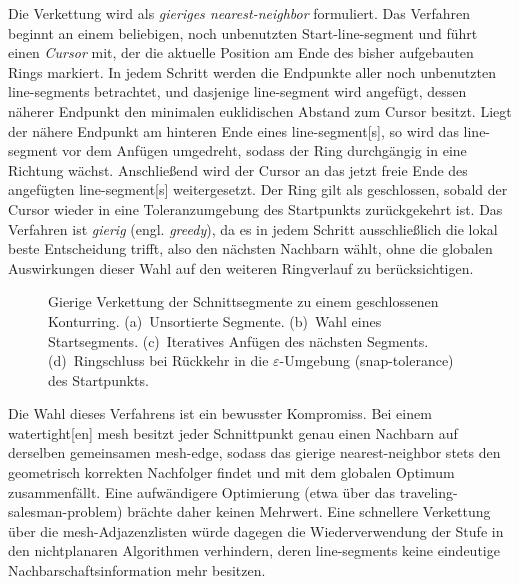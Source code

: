                 Die Verkettung wird als \emph{gieriges \gls{nearest-neighbor}} formuliert.
                Das Verfahren beginnt an einem beliebigen, noch unbenutzten Start-\gls{line-segment} und führt einen \emph{Cursor} mit, der die aktuelle Position am Ende des bisher aufgebauten Rings markiert.
                In jedem Schritt werden die Endpunkte aller noch unbenutzten \glspl{line-segment} betrachtet, und dasjenige \gls{line-segment} wird angefügt, dessen näherer Endpunkt den minimalen euklidischen Abstand zum Cursor besitzt.
                Liegt der nähere Endpunkt am hinteren Ende eines \gls{line-segment}[s], so wird das \gls{line-segment} vor dem Anfügen umgedreht, sodass der Ring durchgängig in eine Richtung wächst.
                Anschließend wird der Cursor an das jetzt freie Ende des angefügten \gls{line-segment}[s] weitergesetzt.
                Der Ring gilt als geschlossen, sobald der Cursor wieder in eine Toleranzumgebung des Startpunkts zurückgekehrt ist.
                Das Verfahren ist \emph{gierig} (engl. \emph{greedy}), da es in jedem Schritt ausschließlich die lokal beste Entscheidung trifft, also den nächsten Nachbarn wählt, ohne die globalen Auswirkungen dieser Wahl auf den weiteren Ringverlauf zu berücksichtigen.

                \begin{figure}[ht]
                    \centering
                    
                    \caption[Greedy-Nearest-Neighbor-Verkettung der Schnittsegmente]{
                        Gierige Verkettung der Schnittsegmente zu einem geschlossenen Konturring.
                        (a)~Unsortierte Segmente.
                        (b)~Wahl eines Startsegments.
                        (c)~Iteratives Anfügen des nächsten Segments.
                        (d)~Ringschluss bei Rückkehr in die $\varepsilon$-Umgebung (\gls{snap-tolerance}) des Startpunkts.
                    }
                    \label{fig:concept-planar-chaining}
                \end{figure}

                Die Wahl dieses Verfahrens ist ein bewusster Kompromiss.
                Bei einem \gls{watertight}[en] \gls{mesh} besitzt jeder Schnittpunkt genau einen Nachbarn auf derselben gemeinsamen \gls{mesh}-\gls{edge}, sodass das gierige \gls{nearest-neighbor} stets den geometrisch korrekten Nachfolger findet und mit dem globalen Optimum zusammenfällt.
                Eine aufwändigere Optimierung (etwa über das \gls{traveling-salesman-problem}) brächte daher keinen Mehrwert.
                Eine schnellere Verkettung über die \gls{mesh}-Adjazenzlisten würde dagegen die Wiederverwendung der Stufe in den nichtplanaren Algorithmen verhindern, deren \glspl{line-segment} keine eindeutige Nachbarschaftsinformation mehr besitzen.

